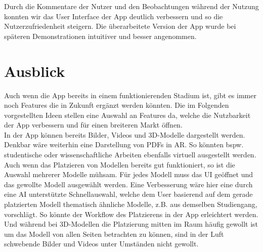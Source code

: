 \documentclass[titlepage, a4paper, 11pt]{scrartcl}
\begin{document}
        Durch die Kommentare der Nutzer und den Beobachtungen während der Nutzung konnten wir das User Interface der App deutlich verbessern und so die Nutzerzufriedenheit steigern. Die überarbeitete Version der App wurde bei späteren Demonstrationen intuitiver und besser angenommen.
        
      \section{Ausblick}
        Auch wenn die App bereits in einem funktionierenden Stadium ist, gibt es immer noch Features die in Zukunft ergänzt werden könnten. 
        Die im Folgenden vorgestellten Ideen stellen eine Auswahl an Features da, welche die Nutzbarkeit der App verbessern und für einen breiteren Markt öffnen.\\
        In der App können bereits Bilder, Videos und 3D-Modelle dargestellt werden. Denkbar wäre weiterhin eine Darstellung von PDFs in AR. 
        So könnten bspw. studentische oder wissenschaftliche Arbeiten ebenfalls virtuell ausgestellt werden.\\
        Auch wenn das Platzieren von Modellen bereits gut funktioniert, so ist die Auswahl mehrerer Modelle mühsam. 
        Für jedes Modell muss das UI geöffnet und das gewollte Modell ausgewählt werden. 
        Eine Verbesserung wäre hier eine durch eine AI unterstützte Schnellauswahl, welche dem User basierend auf dem gerade platzierten Modell thematisch ähnliche Modelle, z.B. aus demselben Studiengang, vorschlägt. 
        So könnte der Workflow des Platzierens in der App erleichtert werden.\\
        Und während bei 3D-Modellen die Platzierung mitten im Raum häufig gewollt ist um das Modell von allen Seiten betrachten zu können, sind in der Luft schwebende Bilder und Videos unter Umständen nicht gewollt. 
\end{document}

